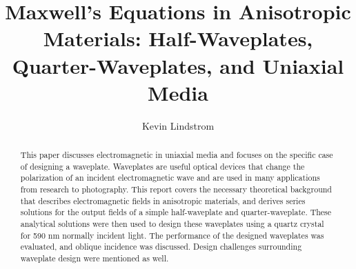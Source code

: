 \documentclass{optica-article}
\begin{document}
\title{Maxwell's Equations in Anisotropic Materials: Half-Waveplates, 
Quarter-Waveplates, and Uniaxial Media}

\author{Kevin Lindstrom}

\address{ Graduate Student, Department of Electrical and Computer
  Engineering, University of Connecticut, 371 Fairfield Way,
  Storrs, CT 06269-4157, USA.\\}




\begin{abstract}
  This paper discusses electromagnetic in uniaxial media and focuses on the 
  specific case of designing a waveplate. Waveplates are useful optical devices
  that change the polarization of an incident electromagnetic wave and are 
  used in many applications from research to photography. This report covers
  the necessary theoretical background that describes electromagnetic fields 
  in anisotropic materials, and derives series solutions for the output fields
  of a simple half-waveplate and quarter-waveplate. These analytical solutions
  were then used to design these waveplates using a quartz crystal for 590 nm 
  normally incident light. The performance of the designed waveplates was
  evaluated, and oblique incidence was discussed. Design challenges surrounding
  waveplate design were mentioned as well.
\end{abstract}

\tableofcontents

\end{document}
